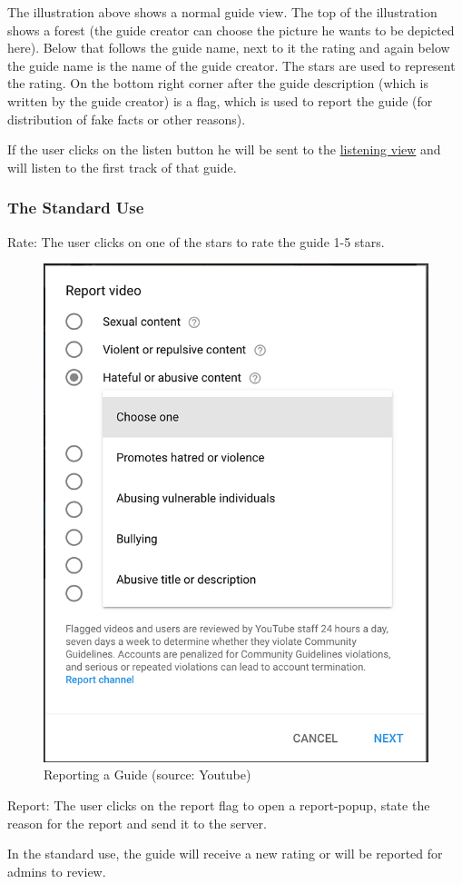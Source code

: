 \documentclass[12pt]{article}
\theoremstyle{definition}
\newenvironment{text}{
   \setlength{\parindent}{0pt}
   \color{black}
}{}
\begin{document}
    \begin{text}
    The illustration above shows a normal guide view. The top of the illustration shows a forest (the guide creator can choose the picture he wants to be depicted here). Below that follows the guide name, next to it the rating and again below the guide name is the name of the guide creator. The stars are used to represent the rating. On the bottom right corner after the guide description (which is written by the guide creator) is a flag, which is used to report the guide (for distribution of fake facts or other reasons).
    
    If the user clicks on the listen button he will be sent to the \hyperref[fig:usecase2]{listening view} and will listen to the first track of that guide. 
    \end{text}
    
    \subsubsection{The Standard Use}
    \begin{text}
    Rate: The user clicks on one of the stars to rate the guide 1-5 stars.
    
    \begin{figure}[hbt!]
        \centering
        \includegraphics[width=0.5\linewidth]{UIs/reporting_ui.png}
        \caption{Reporting a Guide (source: Youtube)}
        \label{fig:reporting_ui}
    \end{figure}
    Report: The user clicks on the report flag to open a report-popup, state the reason for the report and send it to the server.
    
    In the standard use, the guide will receive a new rating or will be reported for admins to review.
    \end{text}
    
\end{document}
